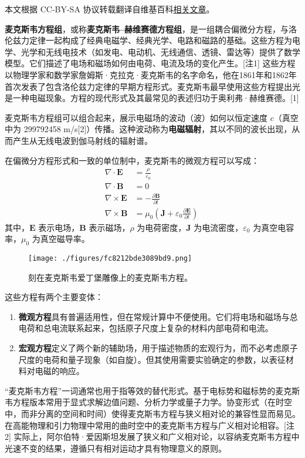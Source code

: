 
本文根据 CC-BY-SA 协议转载翻译自维基百科\href{https://en.wikipedia.org/wiki/Maxwell\%27s_equations}{相关文章}。

\textbf{麦克斯韦方程组}，或称\textbf{麦克斯韦–赫维赛德方程组}，是一组耦合偏微分方程，与洛伦兹力定律一起构成了经典电磁学、经典光学、电路和磁路的基础。这些方程为电学、光学和无线电技术（如发电、电动机、无线通信、透镜、雷达等）提供了数学模型。它们描述了电场和磁场如何由电荷、电流及场的变化产生。[注1] 这些方程以物理学家和数学家詹姆斯·克拉克·麦克斯韦的名字命名，他在1861年和1862年首次发表了包含洛伦兹力定律的早期方程形式。麦克斯韦最早使用这些方程提出光是一种电磁现象。方程的现代形式及其最常见的表述归功于奥利弗·赫维赛德。[1]

麦克斯韦方程组可以组合起来，展示电磁场的波动（波）如何以恒定速度 \( c \)（真空中为 299792458 m/s[2]）传播。这种波动称为\textbf{电磁辐射}，其以不同的波长出现，从而产生从无线电波到伽马射线的辐射谱。

在偏微分方程形式和一致的单位制中，麦克斯韦的微观方程可以写成：
\[
\begin{aligned}
\nabla \cdot \mathbf{E} &= \frac{\rho}{\varepsilon_0} \\
\nabla \cdot \mathbf{B} &= 0 \\
\nabla \times \mathbf{E} &= -\frac{\partial \mathbf{B}}{\partial t} \\
\nabla \times \mathbf{B} &= \mu_0 \left(\mathbf{J} + \varepsilon_0 \frac{\partial \mathbf{E}}{\partial t}\right)
\end{aligned}~
\]
其中，\(\mathbf{E}\) 表示电场，\(\mathbf{B}\) 表示磁场，\(\rho\) 为电荷密度，\(\mathbf{J}\) 为电流密度，\(\varepsilon_0\) 为真空电容率，\(\mu_0\) 为真空磁导率。
\begin{figure}[ht]
\centering
\texttt{[image: ./figures/fc8212bde3089bd9.png]}
\caption{刻在麦克斯韦爱丁堡雕像上的麦克斯韦方程。} \label{fig_MAXS_1}
\end{figure}
这些方程有两个主要变体：
\begin{enumerate}
\item \textbf{微观方程}具有普遍适用性，但在常规计算中不便使用。它们将电场和磁场与总电荷和总电流联系起来，包括原子尺度上复杂的材料内部电荷和电流。
\item \textbf{宏观方程}定义了两个新的辅助场，用于描述物质的宏观行为，而不必考虑原子尺度的电荷和量子现象（如自旋）。但其使用需要实验确定的参数，以表征材料对电磁的响应。
\end{enumerate}
“麦克斯韦方程”一词通常也用于指等效的替代形式。基于电标势和磁标势的麦克斯韦方程版本常用于显式求解边值问题、分析力学或量子力学。协变形式（在时空中，而非分离的空间和时间）使得麦克斯韦方程与狭义相对论的兼容性显而易见。在高能物理和引力物理中常用的曲时空中的麦克斯韦方程与广义相对论相容。[注2] 实际上，阿尔伯特·爱因斯坦发展了狭义和广义相对论，以容纳麦克斯韦方程中光速不变的结果，遵循只有相对运动才具有物理意义的原则。

